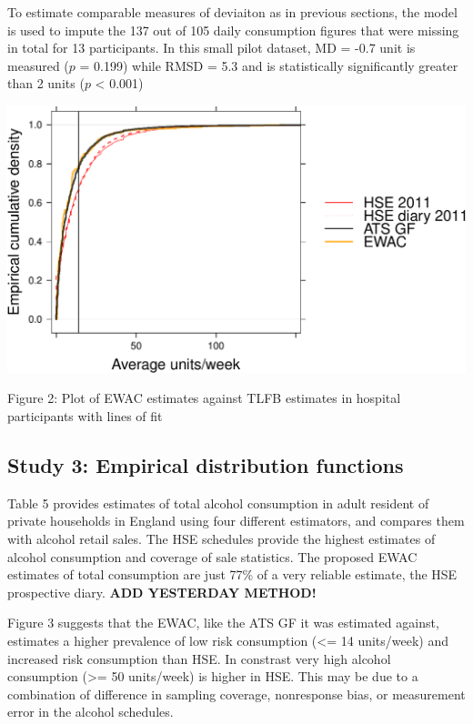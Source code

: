 \documentclass[]{article}
\begin{document}
To estimate comparable measures of deviaiton as in previous sections,
the model is used to impute the 137 out of 105 daily consumption figures
that were missing in total for 13 participants. In this small pilot
dataset, MD = -0.7 unit is measured (\(p\) = 0.199) while RMSD = 5.3 and
is statistically significantly greater than 2 units (\(p\) \textless{}
0.001)



\includegraphics[width=.8\linewidth]{analysis_files/figure-latex/unnamed-chunk-8-1.pdf}

Figure 2: Plot of EWAC estimates against TLFB estimates in hospital
participants with lines of fit


\hypertarget{study-3-empirical-distribution-functions}{%
\subsection{Study 3: Empirical distribution
functions}\label{study-3-empirical-distribution-functions}}

Table 5 provides estimates of total alcohol consumption in adult
resident of private households in England using four different
estimators, and compares them with alcohol retail sales. The HSE
schedules provide the highest estimates of alcohol consumption and
coverage of sale statistics. The proposed EWAC estimates of total
consumption are just 77\% of a very reliable estimate, the HSE
prospective diary. \textbf{ADD YESTERDAY METHOD!}

Figure 3 suggests that the EWAC, like the ATS GF it was estimated
against, estimates a higher prevalence of low risk consumption
(\textless{}= 14 units/week) and increased risk consumption than HSE. In
constrast very high alcohol consumption (\textgreater{}= 50 units/week)
is higher in HSE. This may be due to a combination of difference in
sampling coverage, nonresponse bias, or measurement error in the alcohol
schedules.
\end{document}
